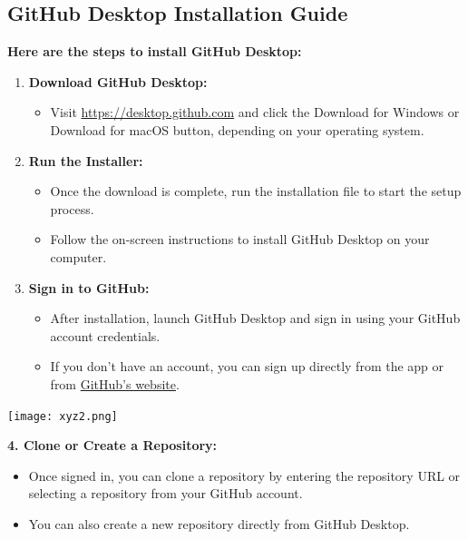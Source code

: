 \documentclass[a4paper,14pt]{article}
\begin{document}
\vspace{20pt}

\subsection*{GitHub Desktop Installation Guide}
\textbf{Here are the steps to install GitHub Desktop:}
\begin{enumerate}
    \item \textbf{Download GitHub Desktop:}
    \begin{itemize}
        \item Visit \url{https://desktop.github.com} and click the Download for Windows or Download for macOS button, depending on your operating system.
    \end{itemize}
    \item \textbf{Run the Installer:}
    \begin{itemize}
        \item Once the download is complete, run the installation file to start the setup process.
        \item Follow the on-screen instructions to install GitHub Desktop on your computer.
    \end{itemize}
    \item \textbf{Sign in to GitHub:}
    \begin{itemize}
        \item After installation, launch GitHub Desktop and sign in using your GitHub account credentials.
        \item If you don’t have an account, you can sign up directly from the app or from \href{https://github.com}{GitHub's website}.
    \end{itemize}
\end{enumerate}

\newpage

\begin{center}
    \texttt{[image: xyz2.png]} \\ %
    \vspace{20pt}
\end{center}

\noindent
\textbf{4. Clone or Create a Repository:}
\begin{itemize}
    \item Once signed in, you can clone a repository by entering the repository URL or selecting a repository from your GitHub account.
    \item You can also create a new repository directly from GitHub Desktop.
\end{itemize}
\end{document}
